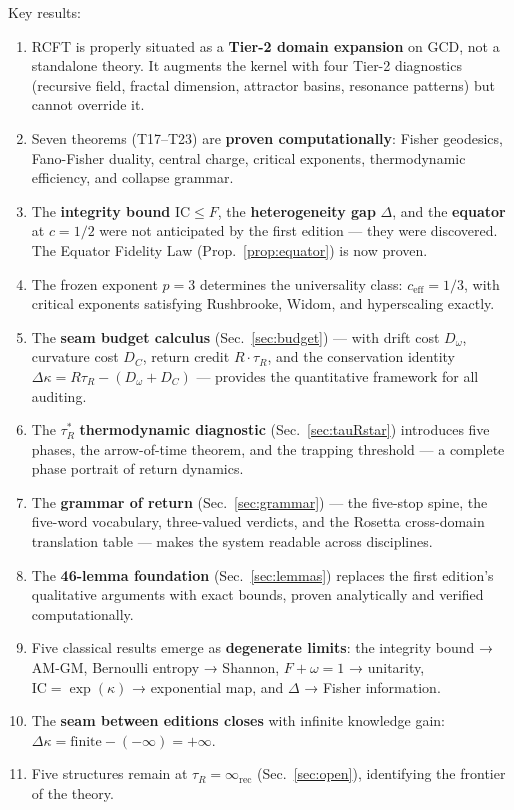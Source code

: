 \documentclass[
  aps,
  prd,
  preprint,
  superscriptaddress,
  nofootinbib,
  floatfix,
  longbibliography
]{revtex4-2}
\newcommand{\tR}{\tau_{\!R}}
\newcommand{\tRstar}{\tau_{\!R}^{*}}
\newcommand{\IC}{\mathrm{IC}}
\newcommand{\Fid}{F}
\newcommand{\Drft}{\omega}
\newcommand{\Curv}{C}
\newcommand{\Logint}{\kappa}
\newcommand{\ceff}{c_{\mathrm{eff}}}
\newcommand{\hetgap}{\Delta}
\begin{document}
Key results:
\begin{enumerate}[nosep,leftmargin=*]
  \item RCFT is properly situated as a \textbf{Tier-2 domain
    expansion} on GCD, not a standalone theory. It augments
    the kernel with four Tier-2 diagnostics
    (recursive field, fractal dimension, attractor basins,
    resonance patterns) but cannot override it.
  \item Seven theorems (T17–T23) are \textbf{proven
    computationally}: Fisher geodesics, Fano-Fisher duality,
    central charge, critical exponents, thermodynamic
    efficiency, and collapse grammar.
  \item The \textbf{integrity bound} $\IC \leq \Fid$, the
    \textbf{heterogeneity gap} $\hetgap$, and the
    \textbf{equator} at $c = 1/2$ were not anticipated
    by the first edition — they were discovered.
    The Equator Fidelity Law (Prop.~\ref{prop:equator})
    is now proven.
  \item The frozen exponent $p = 3$ determines the universality
    class: $\ceff = 1/3$, with critical exponents satisfying
    Rushbrooke, Widom, and hyperscaling exactly.
  \item The \textbf{seam budget calculus}
    (Sec.~\ref{sec:budget}) — with drift cost $D_\Drft$,
    curvature cost $D_\Curv$, return credit $R \cdot \tR$,
    and the conservation identity
    $\Delta\Logint = R\tR - (D_\Drft + D_\Curv)$ —
    provides the quantitative framework for all auditing.
  \item The $\tRstar$ \textbf{thermodynamic diagnostic}
    (Sec.~\ref{sec:tauRstar}) introduces five phases, the
    arrow-of-time theorem, and the trapping threshold
    — a complete phase portrait of return dynamics.
  \item The \textbf{grammar of return}
    (Sec.~\ref{sec:grammar}) — the five-stop spine,
    the five-word vocabulary, three-valued verdicts,
    and the Rosetta cross-domain translation table —
    makes the system readable across disciplines.
  \item The \textbf{46-lemma foundation}
    (Sec.~\ref{sec:lemmas}) replaces the first edition's
    qualitative arguments with exact bounds, proven
    analytically and verified computationally.
  \item Five classical results emerge as \textbf{degenerate
    limits}: the integrity bound → AM-GM, Bernoulli entropy →
    Shannon, $\Fid + \Drft = 1$ → unitarity,
    $\IC = \exp(\Logint)$ → exponential map,
    and $\hetgap$ → Fisher information.
  \item The \textbf{seam between editions closes} with infinite
    knowledge gain:
    $\Delta\Logint = \mathrm{finite} - (-\infty) = +\infty$.
  \item Five structures remain at
    $\tR = \infty_{\mathrm{rec}}$ (Sec.~\ref{sec:open}),
    identifying the frontier of the theory.
\end{enumerate}
\end{document}
